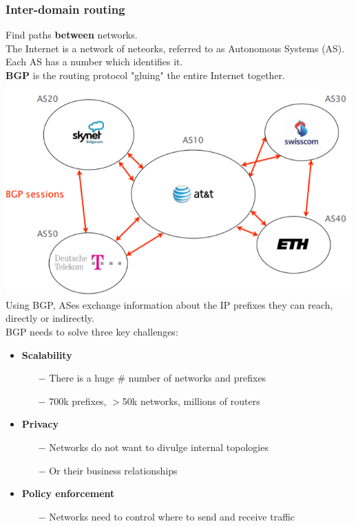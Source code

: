 \documentclass[a4paper, fontsize=8pt, landscape, DIV=1]{scrartcl}
\begin{document}
\begin{multicols*}{4}
		 \subsubsection{Inter-domain routing}
		 Find paths \textbf{between} networks.\\
		 The Internet is a network of neteorks, referred to as Autonomous Systems (AS). Each AS has a number which identifies it. \\
		 \textbf{BGP} is the routing protocol "gluing" the entire Internet together.
		 \includegraphics[width=\columnwidth]{images/Network_Layer/BGP_gluing.png}
		 Using BGP, ASes exchange information about the IP prefixes they can reach, directly or indirectly. \\
		 BGP needs to solve three key challenges:
		 \begin{itemize}[noitemsep]
		 	\item \textbf{Scalability}
		 	\begin{itemize}
		 		\item[$-$] There is a huge \# number of networks and prefixes
		 		\item[$-$] 700k prefixes, $>$50k networks, millions of routers 
		 	\end{itemize}
	 		\item \textbf{Privacy}
	 		\begin{itemize}
	 			\item[$-$] Networks do not want to divulge internal topologies
	 			\item[$-$] Or their business relationships
	 		\end{itemize}
 			\item \textbf{Policy enforcement}
 			\begin{itemize}
 				\item[$-$] Networks need to control where to send and receive traffic

\end{itemize}
\end{itemize}
\end{multicols*}
\end{document}
